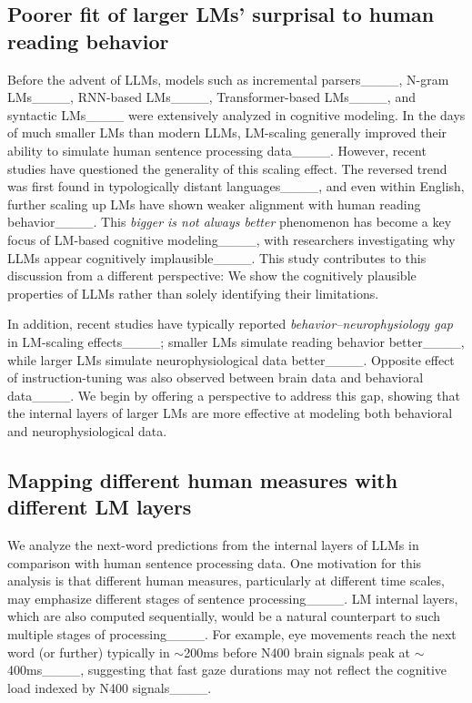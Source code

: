 \subsection{Poorer fit of larger LMs' surprisal to human reading behavior}
\label{subsec:llm_cog}
Before the advent of LLMs, models such as incremental parsers____, N-gram LMs____, RNN-based LMs____, Transformer-based LMs____, and syntactic LMs____ were extensively analyzed in cognitive modeling. 
In the days of much smaller LMs than modern LLMs, LM-scaling generally improved their ability to simulate human sentence processing data____. 
However, recent studies have questioned the generality of this scaling effect. 
The reversed trend was first found in typologically distant languages____, and even within English, further scaling up LMs have shown weaker alignment with human reading behavior____. 
This \textit{bigger is not always better} phenomenon has become a key focus of LM-based cognitive modeling____, with researchers investigating why LLMs appear cognitively implausible____.
This study contributes to this discussion from a different perspective: 
We show the cognitively plausible properties of LLMs rather than solely identifying their limitations. 

In addition, recent studies have typically reported 
\textit{behavior–neurophysiology gap} in LM-scaling effects____;
 smaller LMs simulate reading behavior better____, while larger LMs simulate neurophysiological data better____. 
Opposite effect of instruction-tuning was also observed between  brain data and behavioral data____. 
We begin by offering a perspective to address this gap, showing that the internal layers of larger LMs are more effective at modeling both behavioral and neurophysiological data.


\subsection{Mapping different human measures with different LM layers}
\label{subsec:layer_motivation}
We analyze the next-word predictions from the internal layers of LLMs in comparison with human sentence processing data. 
One motivation for this analysis is that different human measures, particularly at different time scales, may emphasize different stages of sentence processing____. 
LM internal layers, which are also computed sequentially, would be a natural counterpart to such multiple stages of processing____.
For example, eye movements reach the next word (or further) typically in $\sim$200ms before N400 brain signals peak at $\sim$400ms____, suggesting that fast gaze durations may not reflect the cognitive load indexed by N400 signals____. 

